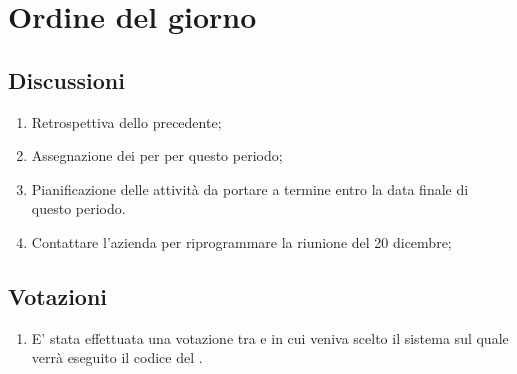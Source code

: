 \section{Ordine del giorno} \label{sec:agenda}
\subsection{Discussioni} \label{subsec:discussione}
\begin{enumerate}
    \item Retrospettiva dello  precedente;
    \item Assegnazione dei  per per questo periodo;
    \item Pianificazione delle attività da portare a termine entro la data finale di questo periodo.
    \item Contattare l'azienda  per riprogrammare la riunione del 20 dicembre;
    
\end{enumerate}

\subsection{Votazioni} \label{subsec:votazione}
\begin{enumerate}
    \item E' stata effettuata una votazione tra  e  in cui veniva scelto il sistema sul quale verrà eseguito il codice del .
\end{enumerate}